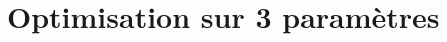 \documentclass[main.tex]{subfiles}
\begin{document}
\section{Optimisation sur 3 paramètres}
\end{document}
